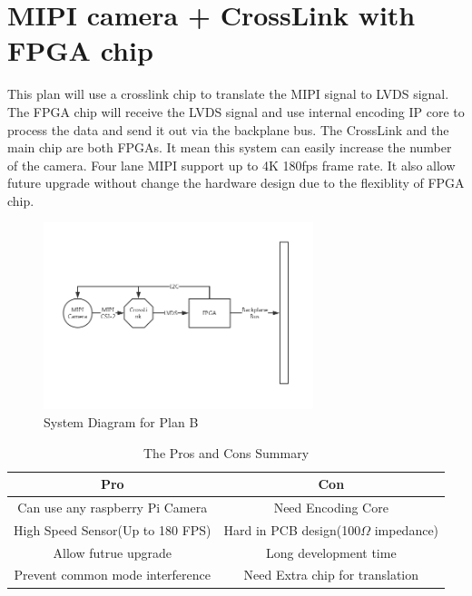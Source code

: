 \documentclass[12pt,article]{memoir}
\begin{document}
\section{MIPI camera + CrossLink with FPGA chip}
This plan will use a crosslink chip to translate the MIPI signal to LVDS signal. The FPGA chip will receive the LVDS signal and use internal encoding IP core to process the data and send it out via the backplane bus. The CrossLink and the main chip are both FPGAs. It mean this system can easily increase the number of the camera. Four lane MIPI support up to 4K 180fps frame rate. It also allow future upgrade without change the hardware design due to the flexiblity of FPGA chip.
\begin{figure}[htp]
\begin{center}
\includegraphics[width=0.7\textwidth]{img/DR00002_Plan2.png}
 \caption{System Diagram for Plan B}	
\end{center}
\end{figure}
\begin{table}[H]
	\centering
		\begin{tabu}{c | c }
		Pro & Con \\ \hline
		Can use any raspberry Pi Camera & Need Encoding Core \\
		High Speed Sensor(Up to 180 FPS) & Hard in PCB design(100$\Omega$ impedance) \\
		Allow futrue upgrade & Long development time \\
		Prevent common mode interference  & Need Extra chip for translation \\
		\end{tabu}
	\caption{The Pros and Cons Summary}
\end{table}
\newpage
\end{document}

